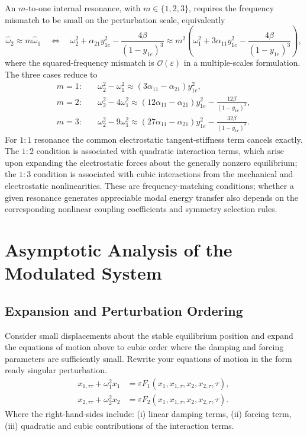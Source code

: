 \documentclass[11pt]{article}
\newenvironment{assignmentinstruction}{\par\begingroup\color{blue}}{\par\endgroup}
\begin{document}
An $m$-to-one internal resonance, with $m\in\{1,2,3\}$, requires the frequency mismatch to be small on the perturbation scale, equivalently
\begin{equation}\label{eq:internal-resonance-general}
\widehat{\omega}_2\approx m\widehat{\omega}_1
\quad\Longleftrightarrow\quad
\omega_2^2+\alpha_{21}y_{1e}^2-\frac{4\beta}{(1-y_{1e})^3}
\approx m^2\left(\omega_1^2+3\alpha_{11}y_{1e}^2-\frac{4\beta}{(1-y_{1e})^3}\right),
\end{equation}
where the squared-frequency mismatch is $\mathcal{O}(\varepsilon)$ in a multiple-scales formulation. The three cases reduce to
\begin{align*}
m=1:\quad &\omega_2^2-\omega_1^2\approx(3\alpha_{11}-\alpha_{21})y_{1e}^2,\\
m=2:\quad &\omega_2^2-4\omega_1^2\approx(12\alpha_{11}-\alpha_{21})y_{1e}^2-\frac{12\beta}{(1-y_{1e})^3},\\
m=3:\quad &\omega_2^2-9\omega_1^2\approx(27\alpha_{11}-\alpha_{21})y_{1e}^2-\frac{32\beta}{(1-y_{1e})^3}.
\end{align*}
For $1{:}1$ resonance the common electrostatic tangent-stiffness term cancels exactly. The $1{:}2$ condition is associated with quadratic interaction terms, which arise upon expanding the electrostatic forces about the generally nonzero equilibrium; the $1{:}3$ condition is associated with cubic interactions from the mechanical and electrostatic nonlinearities. These are frequency-matching conditions; whether a given resonance generates appreciable modal energy transfer also depends on the corresponding nonlinear coupling coefficients and symmetry selection rules.

\section{Asymptotic Analysis of the Modulated System}
\subsection{Expansion and Perturbation Ordering}
\begin{assignmentinstruction}
Consider small displacements about the stable equilibrium position and expand the equations of motion above to cubic order where the damping and forcing parameters are sufficiently small. Rewrite your equations of motion in the form ready singular perturbation.
\[
\begin{aligned}
x_{1,\tau\tau}+\omega_1^2x_1 &= \varepsilon F_1(x_1,x_{1,\tau},x_2,x_{2,\tau},\tau),\\
x_{2,\tau\tau}+\omega_2^2x_2 &= \varepsilon F_2(x_1,x_{1,\tau},x_2,x_{2,\tau},\tau).
\end{aligned}
\]
Where the right-hand-sides include: (i) linear damping terms, (ii) forcing term, (iii) quadratic and cubic contributions of the interaction terms.
\end{assignmentinstruction}
\end{document}
